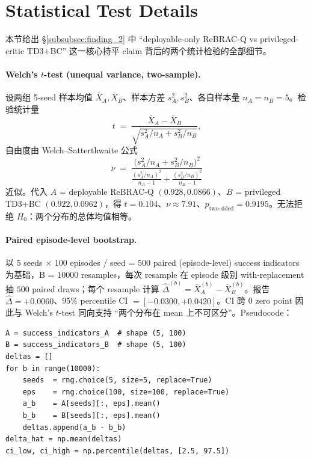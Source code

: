 \section{Statistical Test Details}\label{app:stats}

本节给出 \S\ref{subsubsec:finding_2} 中 ``deployable-only ReBRAC-Q vs privileged-critic TD3+BC'' 这一核心持平 claim 背后的两个统计检验的全部细节。

\paragraph{Welch's $t$-test (unequal variance, two-sample).}\quad
设两组 5-seed 样本均值 $\bar{X}_A, \bar{X}_B$、样本方差 $s_A^2, s_B^2$、各自样本量 $n_A = n_B = 5$。检验统计量
\begin{equation}
t \;=\; \frac{\bar{X}_A - \bar{X}_B}{\sqrt{s_A^2 / n_A + s_B^2 / n_B}},
\label{eq:welch_t}
\end{equation}
自由度由 Welch--Satterthwaite 公式
\begin{equation}
\nu \;=\; \frac{\bigl(s_A^2 / n_A + s_B^2 / n_B\bigr)^2}{\frac{(s_A^2 / n_A)^2}{n_A - 1} + \frac{(s_B^2 / n_B)^2}{n_B - 1}}
\label{eq:welch_df}
\end{equation}
近似。代入 $A$ = deployable ReBRAC-Q $(0.928, 0.0866)$、$B$ = privileged TD3+BC $(0.922, 0.0962)$，得 $t = 0.104$、$\nu \approx 7.91$、$p_{\text{two-sided}} = 0.9195$。无法拒绝 $H_0$：两个分布的总体均值相等。

\paragraph{Paired episode-level bootstrap.}\quad
以 5 seeds $\times$ 100 episodes / seed = $500$ paired (episode-level) success indicators 为基础，B = $10000$ resamples，每次 resample 在 episode 级别 with-replacement 抽 $500$ paired draws；每个 resample 计算 $\hat{\Delta}^{(b)} = \bar{X}_A^{(b)} - \bar{X}_B^{(b)}$。报告 $\hat{\Delta} = +0.0060$、95\% percentile CI $= [-0.0300, +0.0420]$。CI 跨 0 zero point 因此与 Welch's $t$-test 同向支持 ``两个分布在 mean 上不可区分''。Pseudocode：
\begin{verbatim}
A = success_indicators_A  # shape (5, 100)
B = success_indicators_B  # shape (5, 100)
deltas = []
for b in range(10000):
    seeds  = rng.choice(5, size=5, replace=True)
    eps    = rng.choice(100, size=100, replace=True)
    a_b    = A[seeds][:, eps].mean()
    b_b    = B[seeds][:, eps].mean()
    deltas.append(a_b - b_b)
delta_hat = np.mean(deltas)
ci_low, ci_high = np.percentile(deltas, [2.5, 97.5])
\end{verbatim}


